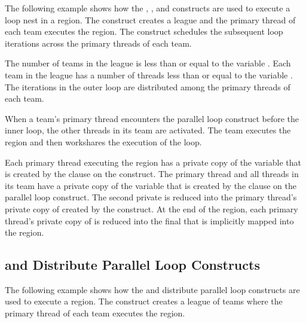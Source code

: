 The following example shows how the , , and  
constructs are used to execute a loop nest in a  region. The  
construct creates a league and the primary thread of each team executes the  
region. The  construct schedules the subsequent loop iterations 
across the primary threads of each team.

The number of teams in the league is less than or equal to the variable . 
Each team in the league has a number of threads less than or equal to the variable 
. The iterations in the outer loop are distributed among the primary 
threads of each team.

When a team's primary thread encounters the parallel loop construct before the inner 
loop, the other threads in its team are activated. The team executes the  
region and then workshares the execution of the loop.


Each primary thread executing the  region has a private copy of the 
variable  that is created by the  clause on the  construct. 
The primary thread and all threads in its team have a private copy of the variable 
 that is created by the  clause on the parallel loop construct. 
The second private  is reduced into the primary thread's private copy of  
created by the  construct. At the end of the  region, 
each primary thread's private copy of  is reduced into the final  that is 
implicitly mapped into the  region.



\subsection{ and Distribute Parallel Loop Constructs}
\label{subsec:teams_distribute_parallel}

The following example shows how the  and distribute 
parallel loop constructs are used to execute a  region. 
The  construct creates a league of teams where the primary thread of each 
team executes the  region.

